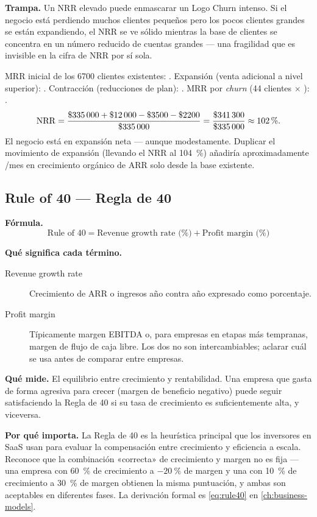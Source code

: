 \textbf{Trampa.} Un NRR elevado puede enmascarar un Logo Churn intenso. Si el negocio está
perdiendo muchos clientes pequeños pero los pocos clientes grandes se están expandiendo, el
NRR se ve sólido mientras la base de clientes se concentra en un número reducido de cuentas
grandes --- una fragilidad que es invisible en la cifra de NRR por sí sola.

\begin{example}
MRR inicial de los \num{6700} clientes existentes: . Expansión (venta adicional
a nivel superior): . Contracción (reducciones de plan): . MRR por
\emph{churn} (44 clientes $\times$ ): .
\[
  \mathrm{NRR} = \frac{\$\num{335000} + \$\num{12000} - \$\num{3500} - \$\num{2200}}
    {\$\num{335000}}
  = \frac{\$\num{341300}}{\$\num{335000}} \approx \qty{102}{\percent}.
\]
El negocio está en expansión neta --- aunque modestamente. Duplicar el movimiento de
expansión (llevando el NRR al \qty{104}{\percent}) añadiría aproximadamente /mes
en crecimiento orgánico de ARR solo desde la base existente.
\end{example}


\subsection{Rule of 40 --- Regla de 40}

\textbf{Fórmula.}
\[
  \text{Rule of 40} = \text{Revenue growth rate (\%)} + \text{Profit margin (\%)}
\]

\textbf{Qué significa cada término.}
\begin{description}
  \item[Revenue growth rate] Crecimiento de ARR o ingresos año contra año expresado como
    porcentaje.
  \item[Profit margin] Típicamente margen EBITDA o, para empresas en etapas más tempranas,
    margen de flujo de caja libre. Los dos no son intercambiables; aclarar cuál se usa antes
    de comparar entre empresas.
\end{description}

\textbf{Qué mide.} El equilibrio entre crecimiento y rentabilidad. Una empresa que gasta de
forma agresiva para crecer (margen de beneficio negativo) puede seguir satisfaciendo la Regla
de 40 si su tasa de crecimiento es suficientemente alta, y viceversa.

\textbf{Por qué importa.} La Regla de 40 es la heurística principal que los inversores en
SaaS usan para evaluar la compensación entre crecimiento y eficiencia a escala. Reconoce que
la combinación «correcta» de crecimiento y margen no es fija --- una empresa con
\qty{60}{\percent} de crecimiento a $-\qty{20}{\percent}$ de margen y una con
\qty{10}{\percent} de crecimiento a \qty{30}{\percent} de margen obtienen la misma
puntuación, y ambas son aceptables en diferentes fases. La derivación formal es
\cref{eq:rule40} en \cref{ch:business-models}.

